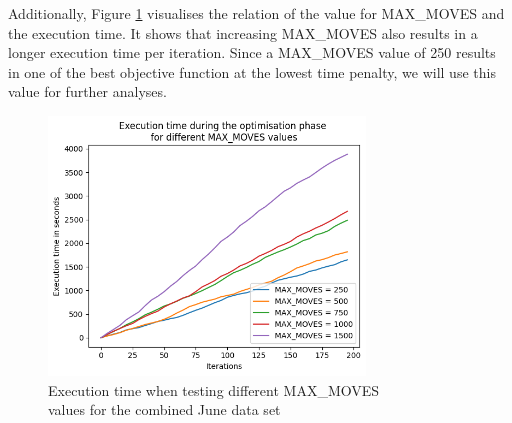 Additionally, Figure \ref{fig:tuning_execution} visualises the relation of the value for MAX\_MOVES and the execution time. It shows that increasing MAX\_MOVES also results in a longer execution time per iteration. Since a MAX\_MOVES value of 250 results in one of the best objective function at the lowest time penalty, we will use this value for further analyses. 

\begin{figure}[H]
	\centering
	\includegraphics[width=0.75\textwidth]{images/tuning/max_moves_execution.png} 
	\caption{Execution time when testing different MAX\_MOVES \\values for the combined June data set}
	\label{fig:tuning_execution}
\end{figure}
